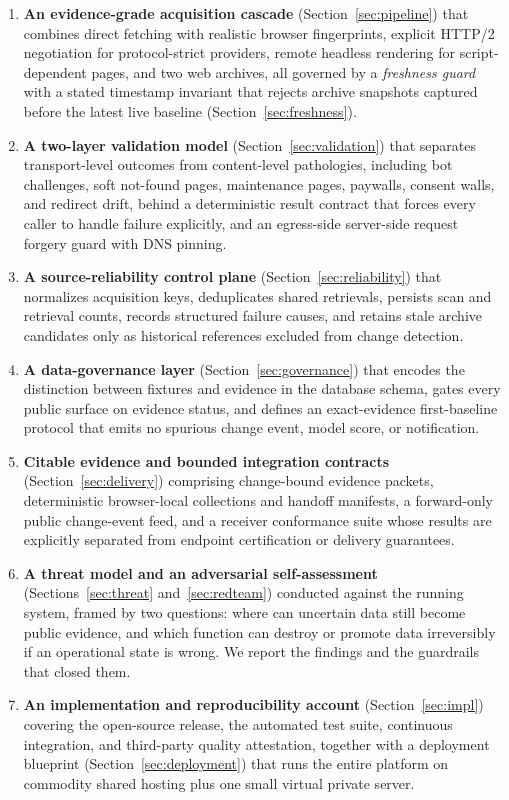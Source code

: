\documentclass[11pt]{article}
\begin{document}
\begin{enumerate}[leftmargin=*]
  \item \textbf{An evidence-grade acquisition cascade} (Section~\ref{sec:pipeline})
  that combines direct fetching with realistic browser fingerprints, explicit
  HTTP/2 negotiation for protocol-strict providers, remote headless rendering
  for script-dependent pages, and two web archives, all governed by a
  \emph{freshness guard} with a stated timestamp invariant that rejects archive
  snapshots captured before the latest live baseline (Section~\ref{sec:freshness}).
  \item \textbf{A two-layer validation model} (Section~\ref{sec:validation})
  that separates transport-level outcomes from content-level pathologies,
  including bot challenges, soft not-found pages, maintenance pages, paywalls,
  consent walls, and redirect drift, behind a deterministic result contract that
  forces every caller to handle failure explicitly, and an egress-side
  server-side request forgery guard with DNS pinning.
  \item \textbf{A source-reliability control plane}
  (Section~\ref{sec:reliability}) that normalizes acquisition keys, deduplicates
  shared retrievals, persists scan and retrieval counts, records structured
  failure causes, and retains stale archive candidates only as historical
  references excluded from change detection.
  \item \textbf{A data-governance layer} (Section~\ref{sec:governance}) that
  encodes the distinction between fixtures and evidence in the database schema,
  gates every public surface on evidence status, and defines an exact-evidence
  first-baseline protocol that emits no spurious change event, model score, or
  notification.
  \item \textbf{Citable evidence and bounded integration contracts}
  (Section~\ref{sec:delivery}) comprising change-bound evidence packets,
  deterministic browser-local collections and handoff manifests, a forward-only
  public change-event feed, and a receiver conformance suite whose results are
  explicitly separated from endpoint certification or delivery guarantees.
  \item \textbf{A threat model and an adversarial self-assessment}
  (Sections~\ref{sec:threat} and~\ref{sec:redteam}) conducted against the
  running system, framed by two questions: where can uncertain data still become
  public evidence, and which function can destroy or promote data irreversibly
  if an operational state is wrong. We report the findings and the guardrails
  that closed them.
  \item \textbf{An implementation and reproducibility account}
  (Section~\ref{sec:impl}) covering the open-source release, the automated test
  suite, continuous integration, and third-party quality attestation, together
  with a deployment blueprint (Section~\ref{sec:deployment}) that runs the entire
  platform on commodity shared hosting plus one small virtual private server.
\end{enumerate}
\end{document}
